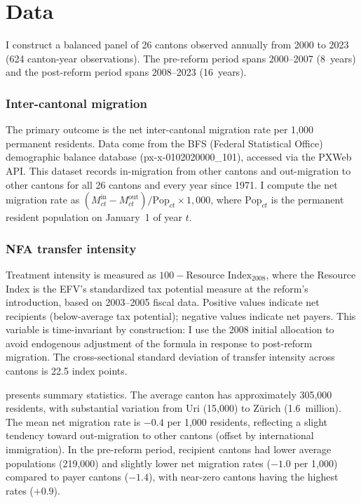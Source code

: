 \documentclass[12pt]{article}
\begin{document}
\section{Data}
\label{sec:data}

I construct a balanced panel of 26 cantons observed annually from 2000 to 2023 (624 canton-year observations). The pre-reform period spans 2000--2007 (8~years) and the post-reform period spans 2008--2023 (16~years).

\subsubsection*{Inter-cantonal migration} The primary outcome is the net inter-cantonal migration rate per 1,000 permanent residents. Data come from the BFS (Federal Statistical Office) demographic balance database (px-x-0102020000\_101), accessed via the PXWeb API. This dataset records in-migration from other cantons and out-migration to other cantons for all 26 cantons and every year since 1971. I compute the net migration rate as $(M^{\text{in}}_{ct} - M^{\text{out}}_{ct}) / \text{Pop}_{ct} \times 1{,}000$, where $\text{Pop}_{ct}$ is the permanent resident population on January~1 of year $t$.

\subsubsection*{NFA transfer intensity} Treatment intensity is measured as $100 - \text{Resource Index}_{2008}$, where the Resource Index is the EFV's standardized tax potential measure at the reform's introduction, based on 2003--2005 fiscal data. Positive values indicate net recipients (below-average tax potential); negative values indicate net payers. This variable is time-invariant by construction: I use the 2008 initial allocation to avoid endogenous adjustment of the formula in response to post-reform migration. The cross-sectional standard deviation of transfer intensity across cantons is 22.5 index points.

 presents summary statistics. The average canton has approximately 305,000 residents, with substantial variation from Uri (15,000) to Zürich (1.6~million). The mean net migration rate is $-0.4$ per 1,000 residents, reflecting a slight tendency toward out-migration to other cantons (offset by international immigration). In the pre-reform period, recipient cantons had lower average populations (219,000) and slightly lower net migration rates ($-1.0$ per 1,000) compared to payer cantons ($-1.4$), with near-zero cantons having the highest rates ($+0.9$).
\end{document}
